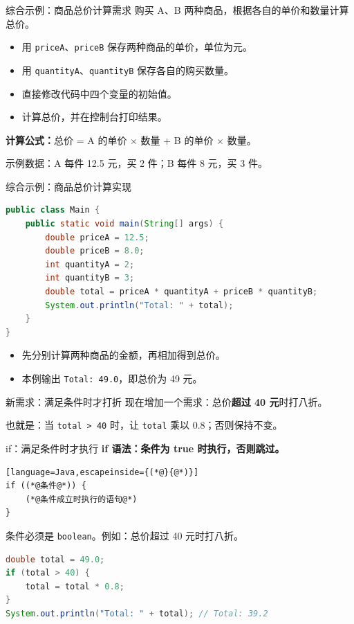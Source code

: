 \documentclass[aspectratio=169]{beamer}
\begin{document}
\begin{frame}{综合示例：商品总价计算需求}
  购买 A、B 两种商品，根据各自的单价和数量计算总价。
  \par\bigskip
  \begin{itemize}
    \item 用 \texttt{priceA}、\texttt{priceB} 保存两种商品的单价，单位为元。
    \item 用 \texttt{quantityA}、\texttt{quantityB} 保存各自的购买数量。
    \item 直接修改代码中四个变量的初始值。
    \item 计算总价，并在控制台打印结果。
  \end{itemize}
  \bigskip
  \textbf{计算公式：}总价 = A 的单价 $\times$ 数量 + B 的单价 $\times$ 数量。
  \par\medskip
  示例数据：A 每件 12.5 元，买 2 件；B 每件 8 元，买 3 件。
\end{frame}

\begin{frame}[fragile]{综合示例：商品总价计算实现}
  \begin{lstlisting}[language=Java]
public class Main {
    public static void main(String[] args) {
        double priceA = 12.5;
        double priceB = 8.0;
        int quantityA = 2;
        int quantityB = 3;
        double total = priceA * quantityA + priceB * quantityB;
        System.out.println("Total: " + total);
    }
}
  \end{lstlisting}
  \begin{itemize}
    \item 先分别计算两种商品的金额，再相加得到总价。
    \item 本例输出 \texttt{Total: 49.0}，即总价为 49 元。
  \end{itemize}
\end{frame}

\begin{frame}{新需求：满足条件时才打折}
  现在增加一个需求：总价\textbf{超过 40 元}时打八折。
  \par
  也就是：当 \texttt{total > 40} 时，让 \texttt{total} 乘以 0.8；否则保持不变。
\end{frame}

\begin{frame}[fragile]{if：满足条件时才执行}
  \textbf{if 语法：条件为 true 时执行，否则跳过。}
  \begin{lstlisting}[language=Java,escapeinside={(*@}{@*)}]
if ((*@条件@*)) {
    (*@条件成立时执行的语句@*)
}
  \end{lstlisting}
  条件必须是 \texttt{boolean}。例如：总价超过 40 元时打八折。
  \begin{lstlisting}[language=Java]
double total = 49.0;
if (total > 40) {
    total = total * 0.8;
}
System.out.println("Total: " + total); // Total: 39.2
  \end{lstlisting}
\end{frame}
\end{document}
